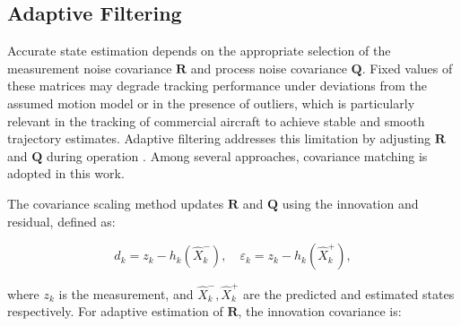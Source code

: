 \documentclass[conference]{IEEEtran}
\begin{document}
%

\subsection{Adaptive Filtering}

Accurate state estimation depends on the appropriate selection of the measurement noise covariance $\mathbf{R}$ and process noise covariance $\mathbf{Q}$. Fixed values of these matrices may degrade tracking performance under
deviations from the assumed motion model or in the presence of outliers, which is particularly relevant in the tracking of commercial aircraft to achieve stable and smooth trajectory estimates. Adaptive filtering addresses this limitation by adjusting $\mathbf{R}$ and $\mathbf{Q}$ during operation \cite{Mehra1972}. Among several
approaches, covariance matching is adopted in this work.

The covariance scaling method updates $\mathbf{R}$ and $\mathbf{Q}$ using the innovation and residual, defined as:

\begin{equation}
d_k = z_k - h_k(\hat{X}^-_k), \quad \varepsilon_k = z_k - h_k(\hat{X}^+_k),
\end{equation}

where $z_k$ is the measurement, and $\hat{X}^-_k, \hat{X}^+_k$ are the predicted and estimated states respectively. For adaptive estimation of $\mathbf{R}$, the innovation covariance is:
\end{document}
